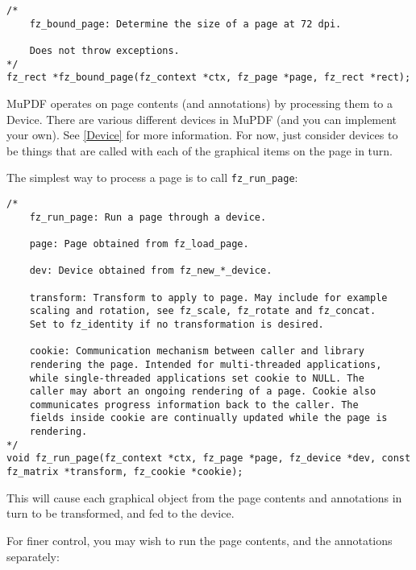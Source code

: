 \documentclass[oneside]{book}
\newcommand{\rjwref}[1] {\autoref{#1} \nameref{#1}}
\begin{document}
\begin{lstlisting}
/*
	fz_bound_page: Determine the size of a page at 72 dpi.

	Does not throw exceptions.
*/
fz_rect *fz_bound_page(fz_context *ctx, fz_page *page, fz_rect *rect);
\end{lstlisting}

MuPDF operates on page contents (and annotations) by processing them to a Device. There are various different devices in MuPDF (and you can implement your own). See \rjwref{Device} for more information. For now, just consider devices to be things that are called with each of the graphical items on the page in turn.

The simplest way to process a page is to call \texttt{fz\_run\_page}:

\begin{lstlisting}
/*
	fz_run_page: Run a page through a device.

	page: Page obtained from fz_load_page.

	dev: Device obtained from fz_new_*_device.

	transform: Transform to apply to page. May include for example
	scaling and rotation, see fz_scale, fz_rotate and fz_concat.
	Set to fz_identity if no transformation is desired.

	cookie: Communication mechanism between caller and library
	rendering the page. Intended for multi-threaded applications,
	while single-threaded applications set cookie to NULL. The
	caller may abort an ongoing rendering of a page. Cookie also
	communicates progress information back to the caller. The
	fields inside cookie are continually updated while the page is
	rendering.
*/
void fz_run_page(fz_context *ctx, fz_page *page, fz_device *dev, const fz_matrix *transform, fz_cookie *cookie);
\end{lstlisting}

This will cause each graphical object from the page contents and annotations in turn to be transformed, and fed to the device.

For finer control, you may wish to run the page contents, and the annotations separately:
\end{document}
